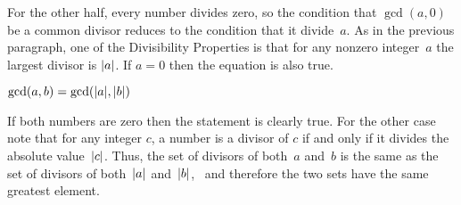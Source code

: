 \documentclass{test}  %
\begin{document}
\begin{problem}
\begin{exes}
\begin{answer}
  For the other half, 
  every number divides zero, so the condition that $\gcd(a,0)$ be a common
  divisor reduces to the condition that it divide~$a$.
  As in the previous paragraph, one of the Divisibility Properties  
  is that for any nonzero integer~$a$ the largest divisor is $\lvert a\rvert$.
  If $a=0$ then the equation is also true.  
\end{answer}
\begin{exercise} 
  $\gcd(a,b)=\gcd(\lvert a\rvert,\lvert b\rvert)$
\end{exercise}
\begin{answer}
  If both numbers are zero then the statement is clearly true.
  For the other case note that for any
  integer $c$, a number is a divisor of $c$ if and only if it divides 
  the absolute value~$\lvert c\rvert$.
  Thus, the set of divisors of both~$a$ and~$b$ 
  is the same as the set of divisors of both~$\lvert a\rvert$ and~$\lvert b\rvert$, \
  and therefore the two sets have the same greatest element.  
\end{answer}
\end{exes} 


\end{problem}
\end{document}
